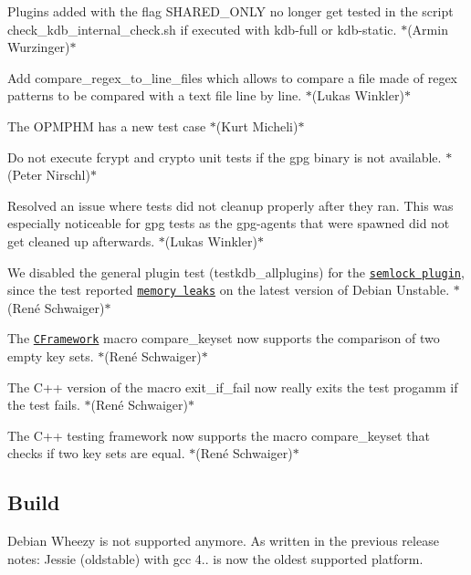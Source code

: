 \begin{DoxyItemize}
\item Plugins added with the flag {\ttfamily S\+H\+A\+R\+E\+D\+\_\+\+O\+N\+LY} no longer get tested in the script {\ttfamily check\+\_\+kdb\+\_\+internal\+\_\+check.\+sh} if executed with kdb-\/full or kdb-\/static. $\ast$(Armin Wurzinger)$\ast$
\item Add {\ttfamily compare\+\_\+regex\+\_\+to\+\_\+line\+\_\+files} which allows to compare a file made of regex patterns to be compared with a text file line by line. $\ast$(Lukas Winkler)$\ast$
\item The O\+P\+M\+P\+HM has a new test case $\ast$(Kurt Micheli)$\ast$
\item Do not execute {\ttfamily fcrypt} and {\ttfamily crypto} unit tests if the {\ttfamily gpg} binary is not available. $\ast$(Peter Nirschl)$\ast$
\item Resolved an issue where tests did not cleanup properly after they ran. This was especially noticeable for {\ttfamily gpg} tests as the {\ttfamily gpg-\/agents} that were spawned did not get cleaned up afterwards. $\ast$(Lukas Winkler)$\ast$
\item We disabled the general plugin test ({\ttfamily testkdb\+\_\+allplugins}) for the \href{https://libelektra.org/plugins/mini}{\tt {\ttfamily semlock} plugin}, since the test reported \href{https://issues.libelektra.org/2113}{\tt memory leaks} on the latest version of Debian Unstable. $\ast$(René Schwaiger)$\ast$
\item The \href{https://master.libelektra.org/tests/cframework}{\tt C\+Framework} macro {\ttfamily compare\+\_\+keyset} now supports the comparison of two empty key sets. $\ast$(René Schwaiger)$\ast$
\item The C++ version of the macro {\ttfamily exit\+\_\+if\+\_\+fail} now really exits the test progamm if the test fails. $\ast$(René Schwaiger)$\ast$
\item The C++ testing framework now supports the macro {\ttfamily compare\+\_\+keyset} that checks if two key sets are equal. $\ast$(René Schwaiger)$\ast$
\end{DoxyItemize}

\subsection*{Build}

Debian Wheezy is not supported anymore. As written in the previous release notes\+: Jessie (oldstable) with gcc 4.. is now the oldest supported platform.


